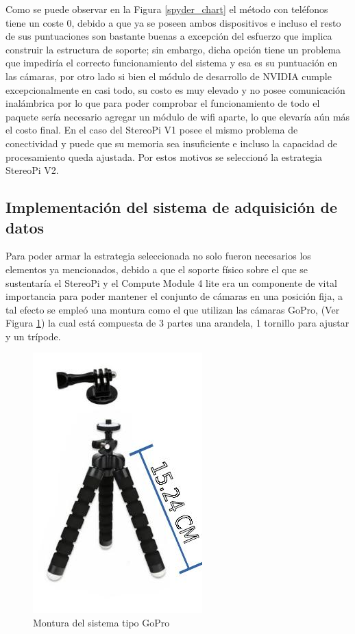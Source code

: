Como se puede observar en la Figura \ref{spyder_chart} el método con teléfonos tiene un coste 0, debido a que ya se poseen ambos dispositivos e incluso el resto de sus puntuaciones son bastante buenas a excepción del esfuerzo que implica construir la estructura de soporte; sin embargo, dicha opción tiene un problema que impediría el correcto funcionamiento del sistema y esa es su puntuación en las cámaras, por otro lado si bien el módulo de desarrollo de NVIDIA cumple excepcionalmente en casi todo, su costo es muy elevado y no posee comunicación inalámbrica por lo que para poder comprobar el funcionamiento de todo el paquete sería necesario agregar un módulo de wifi aparte, lo que elevaría aún más el costo final. En el caso del StereoPi V1 posee el mismo problema de conectividad y puede que su memoria sea insuficiente e incluso la capacidad de procesamiento queda ajustada. Por estos motivos se seleccionó la estrategia StereoPi V2.  
\subsection{Implementación del sistema de adquisición de datos}
Para poder armar la estrategia seleccionada no solo fueron necesarios los elementos ya mencionados, debido a que el soporte físico sobre el que se sustentaría el StereoPi y el Compute Module 4 lite era un componente de vital importancia para poder mantener el conjunto de cámaras en una posición fija, a tal efecto se empleó una montura como el que utilizan las cámaras GoPro, (Ver Figura \ref{gopro_support}) la cual está compuesta de 3 partes una arandela, 1 tornillo para ajustar y un trípode.
\begin{figure}[H]
    \centering
    \includegraphics[scale=0.5]{Recursos/go_pro_support.jpg}
    \caption{Montura del sistema tipo GoPro}
    \label{gopro_support}
\end{figure}
